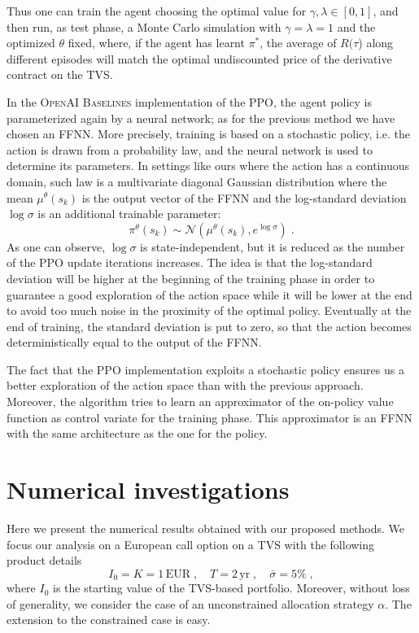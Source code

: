 \documentclass[runningheads]{m2ef}
\begin{document}
	Thus one can train the agent choosing the optimal value for $\gamma,\lambda\in[0,1]$, and then run, as test phase, a Monte Carlo simulation with $\gamma=\lambda=1$ and the optimized $\theta$ fixed, where, if the agent has learnt $\pi^*$, the average of $R(\tau$) along different episodes will match the optimal undiscounted price of the derivative contract on the TVS.  
	

	In the \textsc{OpenAI Baselines} implementation of the PPO, the agent policy is parameterized again by a neural network; as for the previous method we have chosen an FFNN. More precisely, training is based on a stochastic policy, i.e. the action is drawn from a probability law, and the neural network is used to determine its parameters. In settings like ours where the action has a continuous domain, such law is a multivariate diagonal Gaussian distribution where the mean $\mu^\theta(s_k)$ is the output vector of the FFNN and the log-standard deviation $\log\sigma$ is an additional trainable parameter:
	\begin{equation}
		\pi^\theta(s_k) \sim \mathcal{N}(\mu^\theta(s_k),e^{\log\sigma}) \; .
	\end{equation}
	As one can observe, $\log\sigma$ is state-independent, but it is reduced as the number of the PPO update iterations increases. The idea is that the log-standard deviation will be higher at the beginning of the training phase in order to guarantee a good exploration of the action space while it will be lower at the end to avoid too much noise in the proximity of the optimal policy. Eventually at the end of training, the standard deviation is put to zero, so that the action becomes deterministically equal to the output of the FFNN.

	The fact that the PPO implementation exploits a stochastic policy ensures us a better exploration of the action space than with the previous approach. Moreover, the algorithm tries to learn an approximator of the on-policy value function as control variate for the training phase. This approximator is an FFNN with the same architecture as the one for the policy.


	\section{Numerical investigations}\label{sec:Numerical_investigations}
	Here we present the numerical results obtained with our proposed methods. We focus our analysis on a European call option on a TVS with the following product details
	\begin{equation}\nonumber
		I_0 = K = 1 \, \text{EUR} \; , \quad T=2 \, \text{yr} \; , \quad \bar{\sigma} = 5\% \; ,
	\end{equation}
	where $I_0$ is the starting value of the TVS-based portfolio.
	Moreover, without loss of generality, we consider the case of an unconstrained allocation strategy $\alpha$. The extension to the constrained case is easy.
\end{document}
